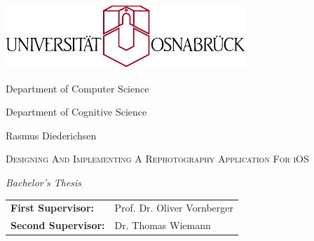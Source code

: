 \documentclass[
   pdftex,
   fontsize=11pt,
   a4paper
]{scrbook}
\begin{document}
\begin{titlepage}
   \thispagestyle{empty}
   \vspace*{2cm}

   \begin{center}

      \Large

      \includegraphics[width=.5\textwidth]{../gfx/uni.pdf}

      \vspace{2cm}

      Department of Computer Science

      Department of Cognitive Science

      \vspace{2cm}

      {
         \LARGE
         Rasmus Diederichsen
      }

      \vspace{2cm}

      {
         \Huge \scshape
         Designing And Implementing A Rephotography Application For iOS
      }

      \vspace{2cm}

      {
         \LARGE \emph{Bachelor's Thesis}
      }

      \vspace{3cm}

      {
         \begin{tabular}{>{\bfseries}ll}
            First Supervisor: & Prof. Dr. Oliver Vornberger \\
            Second Supervisor: & Dr. Thomas Wiemann
         \end{tabular}
      }

   \end{center}
\end{titlepage}
\end{document}
